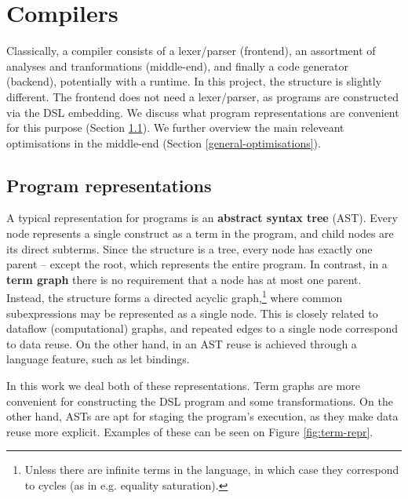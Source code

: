 \section{Compilers}
\label{compiler-techniques}

Classically, a compiler consists of a lexer/parser (frontend), an assortment of analyses and tranformations (middle-end), and finally a code generator (backend), potentially with a runtime. In this project, the structure is slightly different. The frontend does not need a lexer/parser, as programs are constructed via the DSL embedding. We discuss what program representations are convenient for this purpose (Section \ref{representations}). We further overview the main releveant optimisations in the middle-end (Section \ref{general-optimisations}).

\subsection{Program representations} \label{representations}

A typical representation for programs is an \textbf{abstract syntax tree} (AST). 
Every node represents a single construct as a term in the program, and child nodes are its direct subterms. 
Since the structure is a tree, every node has exactly one parent -- except the root, which represents the entire program. 
In contrast, in a \textbf{term graph} there is no requirement that a node has at most one parent. 
Instead, the structure forms a directed acyclic graph,\footnote{Unless there are infinite terms in the language, in which case they correspond to cycles (as in e.g. equality saturation).} where common subexpressions may be represented as a single node. 
This is closely related to dataflow (computational) graphs, and repeated edges to a single node correspond to data reuse. On the other hand, in an AST reuse is achieved through a language feature, such as let bindings.

In this work we deal both of these representations. Term graphs are more convenient for constructing the DSL program and some transformations. On the other hand, ASTs are apt for staging the program's execution, as they make data reuse more explicit. Examples of these can be seen on Figure \ref{fig:term-repr}.

